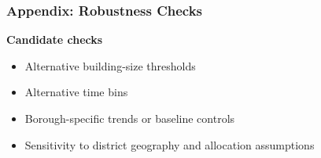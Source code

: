 
\begin{frame}
    \frametitle{Appendix: Robustness Checks}

    \textbf{Candidate checks}
    \begin{itemize}
        \item Alternative building-size thresholds
        \item Alternative time bins
        \item Borough-specific trends or baseline controls
        \item Sensitivity to district geography and allocation assumptions
    \end{itemize}
\end{frame}
